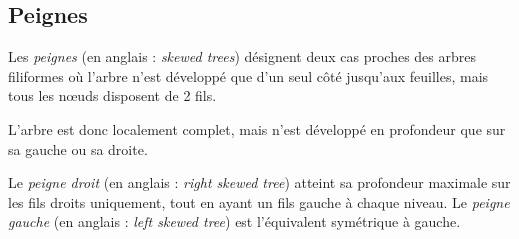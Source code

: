 \documentclass[11pt,a4paper]{article}
\begin{document}
\medskip

\subsection{Peignes}

Les \textit{peignes} (en anglais : \textit{skewed trees}) désignent deux cas proches des arbres filiformes où l'arbre n'est développé que d'un seul côté jusqu'aux feuilles, mais tous les nœuds disposent de 2 fils.

L'arbre est donc localement complet, mais n'est développé en profondeur que sur sa gauche ou sa droite.

Le \textit{peigne droit} (en anglais : \textit{right skewed tree}) atteint sa profondeur maximale sur les fils droits uniquement, tout en ayant un fils gauche à chaque niveau.
Le \textit{peigne gauche} (en anglais : \textit{left skewed tree}) est l'équivalent symétrique à gauche.
\end{document}

